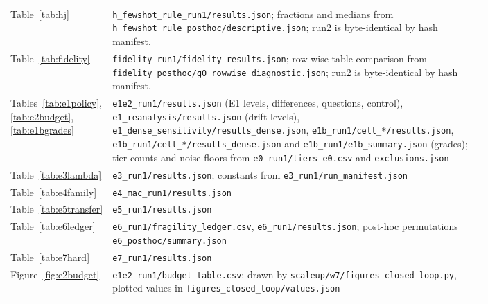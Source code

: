 \documentclass[11pt,a4paper]{article}
\begin{document}
{\begin{longtable}{lp{0.80\linewidth}}
Table~\ref{tab:hj} & \texttt{h\_\allowbreak fewshot\_\allowbreak rule\_\allowbreak run1/\allowbreak results.json}; fractions and medians from \texttt{h\_\allowbreak fewshot\_\allowbreak rule\_\allowbreak posthoc/\allowbreak descriptive.json}; run2 is byte-identical by hash manifest. \\
Table~\ref{tab:fidelity} & \texttt{fidelity\_\allowbreak run1/\allowbreak fidelity\_\allowbreak results.json}; row-wise table comparison from \texttt{fidelity\_\allowbreak posthoc/\allowbreak g0\_\allowbreak rowwise\_\allowbreak diagnostic.json}; run2 is byte-identical by hash manifest. \\
Tables~\ref{tab:e1policy}, \ref{tab:e2budget}, \ref{tab:e1bgrades} & \texttt{e1e2\_\allowbreak run1/\allowbreak results.json} (E1 levels, differences, questions, control), \texttt{e1\_\allowbreak reanalysis/\allowbreak results.json} (drift levels), \texttt{e1\_\allowbreak dense\_\allowbreak sensitivity/\allowbreak results\_\allowbreak dense.json}, \texttt{e1b\_\allowbreak run1/\allowbreak cell\_*/\allowbreak results.json}, \texttt{e1b\_\allowbreak run1/\allowbreak cell\_*/\allowbreak results\_\allowbreak dense.json} and \texttt{e1b\_\allowbreak run1/\allowbreak e1b\_\allowbreak summary.json} (grades); tier counts and noise floors from \texttt{e0\_\allowbreak run1/\allowbreak tiers\_\allowbreak e0.csv} and \texttt{exclusions.json} \\
Table~\ref{tab:e3lambda} & \texttt{e3\_\allowbreak run1/\allowbreak results.json}; constants from \texttt{e3\_\allowbreak run1/\allowbreak run\_\allowbreak manifest.json} \\
Table~\ref{tab:e4family} & \texttt{e4\_\allowbreak mac\_\allowbreak run1/\allowbreak results.json} \\
Table~\ref{tab:e5transfer} & \texttt{e5\_\allowbreak run1/\allowbreak results.json} \\
Table~\ref{tab:e6ledger} & \texttt{e6\_\allowbreak run1/\allowbreak fragility\_\allowbreak ledger.csv}, \texttt{e6\_\allowbreak run1/\allowbreak results.json}; post-hoc permutations \texttt{e6\_\allowbreak posthoc/\allowbreak summary.json} \\
Table~\ref{tab:e7hard} & \texttt{e7\_\allowbreak run1/\allowbreak results.json} \\
Figure~\ref{fig:e2budget} & \texttt{e1e2\_\allowbreak run1/\allowbreak budget\_\allowbreak table.csv}; drawn by \texttt{scaleup/\allowbreak w7/\allowbreak figures\_\allowbreak closed\_\allowbreak loop.py}, plotted values in \texttt{figures\_\allowbreak closed\_\allowbreak loop/\allowbreak values.json} \\

\end{longtable}}
\end{document}
